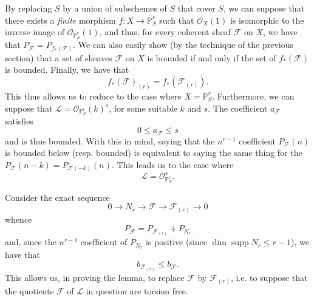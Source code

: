   \begin{cproof}
      By replacing $S$ by a union of subschemes of $S$ that cover $S$, we can suppose that there exists a \emph{finite} morphism $f\colon X\to\mathbb{P}_S^r$ such that $\mathcal{O}_X(1)$ is isomorphic to the inverse image of $\mathcal{O}_{\mathbb{P}_S^r}(1)$, and thus, for every coherent sheaf $\mathcal{F}$ on $X$, we have that $P_\mathcal{F}=P_{f_*(\mathcal{F})}$.
      We can also easily show (by the technique of the previous section) that a set of sheaves $\mathcal{F}$ on $X$ is bounded if and only if the set of $f_*(\mathcal{F})$ is bounded.
      Finally, we have that
      \[
        f_*(\mathcal{F})_{(r)}
        = f_*(\mathcal{F}_{(r)}).
      \]
      This thus allows us to reduce to the case where $X=\mathbb{P}_S^r$.
      Furthermore, we can suppose that $\mathcal{L}=\mathcal{O}_{\mathbb{P}_S^r}(k)^s$, for some suitable $k$ and $s$.
      The coefficient $a_\mathcal{F}$ satisfies
      \[
        0\leqslant a_\mathcal{F} \leqslant s
      \]
      and is thus bounded.
      With this in mind, saying that the $n^{r-1}$ coefficient $P_\mathcal{F}(n)$ is bounded below (resp. bounded) is equivalent to saying the same thing for the $P_\mathcal{F}(n-k)=P_{\mathcal{F}(-k)}(n)$.
      This leads us to the case where
     \[
        \mathcal{L}
        = \mathcal{O}_{\mathbb{P}_S^r}^s.
      \]
  
      Consider the exact sequence
      \[
        0 \to N_r \to \mathcal{F} \to \mathcal{F}_{(r)} \to 0
      \]
      whence
      \[
        P_\mathcal{F}
        = P_{\mathcal{F}_{(r)}} + P_{N_r}
      \]
      and, since the $n^{r-1}$ coefficient of $P_{N_r}$ is positive (since $\dim\operatorname{supp} N_r\leqslant r-1$), we have that
      \[
        b_{\mathcal{F}_{(r)}} \leqslant b_\mathcal{F}.
      \]
      This allows us, in proving the lemma, to replace $\mathcal{F}$ by $\mathcal{F}_{(r)}$, i.e. to suppose that the quotients $\mathcal{F}$ of $\mathcal{L}$ in question are torsion free.


\end{cproof}

